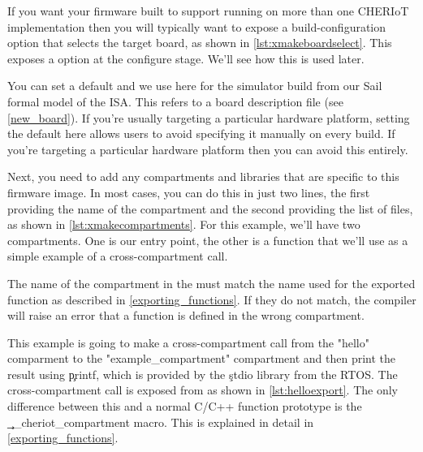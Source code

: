 If you want your firmware built to support running on more than one CHERIoT implementation then you will typically want to expose a build-configuration option that selects the target board, as shown in \ref{lst:xmakeboardselect}.
This exposes a  option at the configure stage. We'll see how this is used later.

\lualisting[filename=examples/hello_world/xmake.lua,marker=board,label=lst:xmakeboardselect,caption="Build system code for allowing the board to be selected at configure time"]{}

You can set a default and we use  here for the simulator build from our Sail formal model of the ISA.
This refers to a board description file (see \ref{new_board}).
If you're usually targeting a particular hardware platform, setting the default here allows users to avoid specifying it manually on every build.
If you're  targeting a particular hardware platform then you can avoid this entirely.

Next, you need to add any compartments and libraries that are specific to this firmware image.
In most cases, you can do this in just two lines, the first providing the name of the compartment and the second providing the list of files, as shown in \ref{lst:xmakecompartments}.
For this example, we'll have two compartments.
One is our entry point, the other is a function that we'll use as a simple example of a cross-compartment call.

\lualisting[filename=examples/hello_world/xmake.lua,marker=compartments,label=lst:xmakecompartments,caption="Build system code for building compartments"]{}

\begin{caution}
	The name of the compartment in the  must match the name used for the exported function as described in \ref{exporting_functions}.
	If they do not match, the compiler will raise an error that a function is defined in the wrong compartment.
\end{caution}

This example is going to make a cross-compartment call from the "hello" comparment to the "example_compartment" compartment and then print the result using \c{printf}, which is provided by the \c{stdio} library from the RTOS.
The cross-compartment call is exposed from  as shown in \ref{lst:helloexport}.
The only difference between this and a normal C/C++ function prototype is the \c{__cheriot_compartment} macro.
This is explained in detail in \ref{exporting_functions}.

